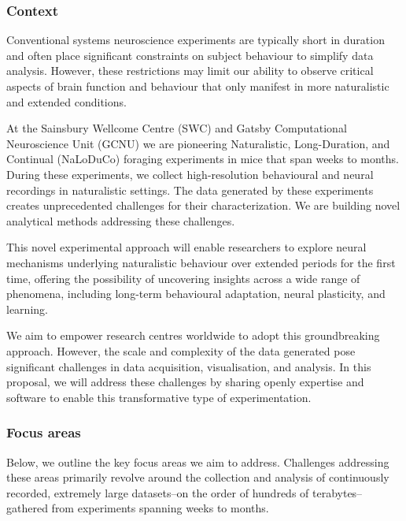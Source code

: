 \subsubsection{Context}

Conventional systems neuroscience experiments are typically short in duration
and often place significant constraints on subject behaviour to simplify data
analysis.
%
However, these restrictions may limit our ability to observe critical
aspects of brain function and behaviour that only manifest in more naturalistic
and extended conditions.

At the Sainsbury Wellcome Centre (SWC) and Gatsby Computational Neuroscience
Unit (GCNU) we are pioneering Naturalistic, Long-Duration, and Continual
(NaLoDuCo) foraging experiments in mice that span weeks to months. During these
experiments, we collect high-resolution behavioural and neural recordings in
naturalistic settings.
%
The data generated by these experiments creates unprecedented challenges for
their characterization. We are building novel analytical methods addressing
these challenges.

This novel experimental approach will enable researchers to explore neural
mechanisms underlying naturalistic behaviour over extended periods for the first
time, offering the possibility of uncovering insights across a wide range of
phenomena, including long-term behavioural adaptation, neural plasticity, and
learning.
%

We aim to empower research centres worldwide to adopt this
groundbreaking approach.
%
However, the scale and complexity of the data generated pose significant
challenges in data acquisition, visualisation, and analysis.
%
In this proposal, we will address these challenges by sharing openly expertise
and software to enable this transformative type of experimentation.

\subsubsection{Focus areas}

Below, we outline the key focus areas we aim to address.
%
Challenges addressing these areas primarily revolve around the collection
and analysis of continuously recorded, extremely large datasets--on the order
of hundreds of terabytes--gathered from experiments spanning weeks to months.


